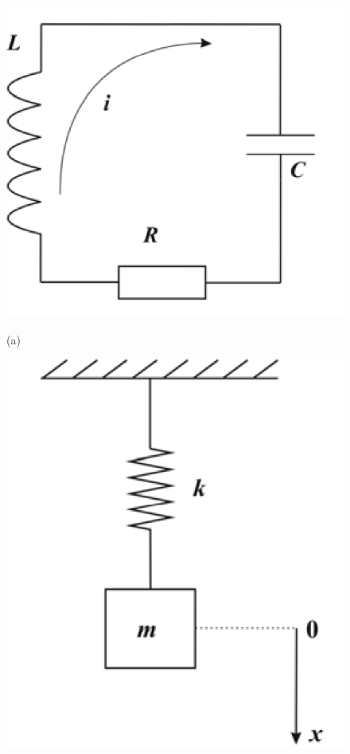 \begin{figure}[h!]
        \centering
        \begin{minipage}{0.45\linewidth}
                \centering  
                \includegraphics[]{fig/lect5/1a}

                (a)
        \end{minipage}
        \begin{minipage}{0.45\linewidth}
                \centering  
                \includegraphics[]{fig/lect5/1b}


\end{minipage}
\end{figure}
